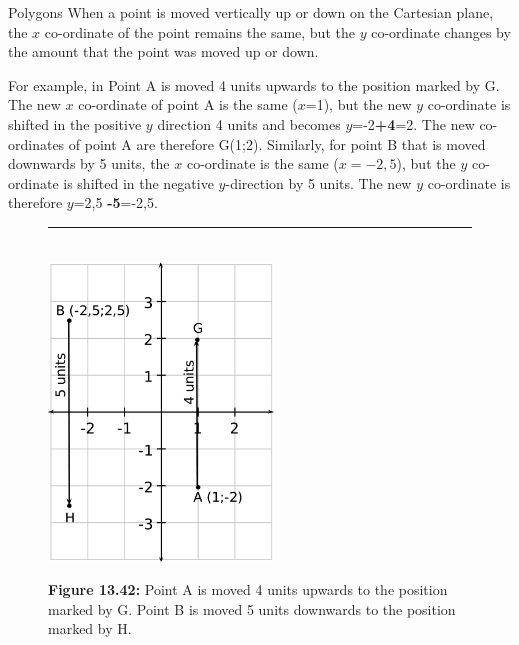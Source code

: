 \begin{exercises}{Polygons}
        \label{m39358*id70438}When a point is moved vertically up or down on the Cartesian plane, the $x$ co-ordinate of the point remains the same, but the $y$ co-ordinate changes by the amount that the point was moved up or down.\par 
        \label{m39358*id70461}For example, in  Point A is moved 4 units upwards to the position marked by G. The new $x$ co-ordinate of point A is the same ($x$=1), but the new $y$ co-ordinate is shifted in the positive $y$ direction 4 units and becomes $y$=-2\textbf{+4}=2. The new co-ordinates of point A are therefore G(1;2). Similarly, for point B that is moved downwards by 5 units, the $x$ co-ordinate is the same ($x=-2,5$), but the $y$ co-ordinate is shifted in the negative $y$-direction by 5 units. The new $y$ co-ordinate is therefore $y$=2,5 \textbf{-5}=-2,5.\par 
        
    \setcounter{subfigure}{0}


	\begin{figure}[H] %
    \begin{center}
    \rule[.1in]{\figurerulewidth}{.005in} \\
        \label{m39358*uid70!!!underscore!!!media}\label{m39358*uid70!!!underscore!!!printimage}\includegraphics[height=300px]{col11306.imgs/m39358_MG10C14_023.png} %
        
      \vspace{2pt}
    \vspace{\rubberspace}\par \begin{cnxcaption}
	  \small \textbf{Figure 13.42: }Point A is moved 4 units upwards to the position marked by G. Point B is moved 5 units downwards to the position marked by H.
	\end{cnxcaption}
      

\end{center}
\end{figure}
\end{exercises}
